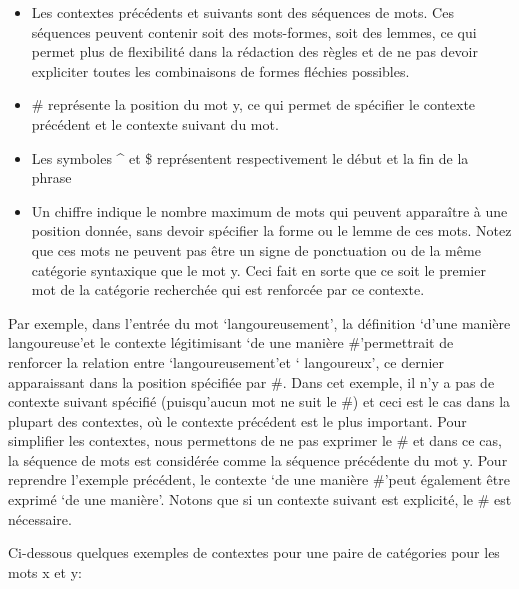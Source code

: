 \begin{itemize}
    \item{Les contextes précédents et suivants sont des séquences de mots. Ces 
    séquences peuvent contenir soit des mots-formes, soit des lemmes, ce qui 
    permet plus de flexibilité dans la rédaction des règles et de ne pas devoir 
    expliciter toutes les combinaisons de formes fléchies possibles.}

    \item{\# représente la position du mot y, ce qui permet de spécifier le 
    contexte précédent et le contexte suivant du mot.}

    \item{Les symboles \string^ et \$ représentent respectivement le début et 
    la fin de la phrase}

    \item{Un chiffre indique le nombre maximum de mots qui peuvent apparaître à 
    une position donnée, sans devoir spécifier la forme ou le lemme de ces mots. 
    Notez que ces mots ne peuvent pas être un signe de ponctuation ou de la 
    même catégorie syntaxique que le mot y. Ceci fait en sorte que ce soit 
    le premier mot de la catégorie recherchée qui est renforcée par ce 
    contexte.}

\end{itemize}

Par exemple, dans l'entrée du mot \lq{langoureusement}\rq, la définition 
\lq{d'une manière langoureuse}\rq et le contexte légitimisant \lq{de une manière 
\#}\rq permettrait de renforcer la relation entre \lq langoureusement\rq et \lq 
langoureux\rq, ce dernier apparaissant dans la position spécifiée par \#. Dans 
cet exemple, il n'y a pas de contexte suivant spécifié (puisqu'aucun mot ne suit 
le \#) et ceci est le cas dans la plupart des contextes, où le contexte 
précédent est le plus important. Pour simplifier les contextes, nous permettons 
de ne pas exprimer le \# et dans ce cas, la séquence de mots est considérée 
comme la séquence précédente du mot y. Pour reprendre l'exemple précédent, le 
contexte \lq{de une manière \#}\rq peut également être exprimé \lq{de une 
manière}\rq. Notons que si un contexte suivant est explicité, le \# est 
nécessaire.

Ci-dessous quelques exemples de contextes pour une paire de catégories pour les 
mots x et y:

